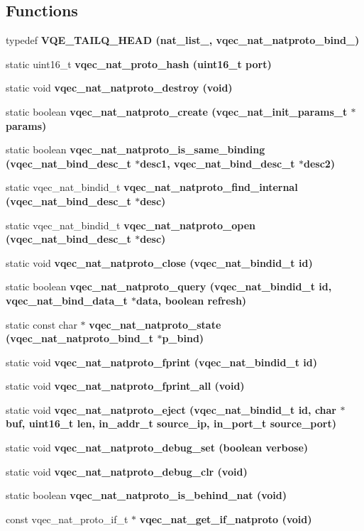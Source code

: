\subsection*{Functions}
\begin{CompactItemize}
\item 
typedef \bf{VQE\_\-TAILQ\_\-HEAD} (nat\_\-list\_\-, \bf{vqec\_\-nat\_\-natproto\_\-bind\_\-})
\item 
static uint16\_\-t \bf{vqec\_\-nat\_\-proto\_\-hash} (uint16\_\-t port)
\item 
static void \bf{vqec\_\-nat\_\-natproto\_\-destroy} (void)
\item 
static boolean \bf{vqec\_\-nat\_\-natproto\_\-create} (vqec\_\-nat\_\-init\_\-params\_\-t $\ast$params)
\item 
static boolean \bf{vqec\_\-nat\_\-natproto\_\-is\_\-same\_\-binding} (vqec\_\-nat\_\-bind\_\-desc\_\-t $\ast$desc1, vqec\_\-nat\_\-bind\_\-desc\_\-t $\ast$desc2)
\item 
static vqec\_\-nat\_\-bindid\_\-t \bf{vqec\_\-nat\_\-natproto\_\-find\_\-internal} (vqec\_\-nat\_\-bind\_\-desc\_\-t $\ast$desc)
\item 
static vqec\_\-nat\_\-bindid\_\-t \bf{vqec\_\-nat\_\-natproto\_\-open} (vqec\_\-nat\_\-bind\_\-desc\_\-t $\ast$desc)
\item 
static void \bf{vqec\_\-nat\_\-natproto\_\-close} (vqec\_\-nat\_\-bindid\_\-t id)
\item 
static boolean \bf{vqec\_\-nat\_\-natproto\_\-query} (vqec\_\-nat\_\-bindid\_\-t id, vqec\_\-nat\_\-bind\_\-data\_\-t $\ast$data, boolean refresh)
\item 
static const char $\ast$ \bf{vqec\_\-nat\_\-natproto\_\-state} (\bf{vqec\_\-nat\_\-natproto\_\-bind\_\-t} $\ast$p\_\-bind)
\item 
static void \bf{vqec\_\-nat\_\-natproto\_\-fprint} (vqec\_\-nat\_\-bindid\_\-t id)
\item 
static void \bf{vqec\_\-nat\_\-natproto\_\-fprint\_\-all} (void)
\item 
static void \bf{vqec\_\-nat\_\-natproto\_\-eject} (vqec\_\-nat\_\-bindid\_\-t id, char $\ast$buf, uint16\_\-t len, in\_\-addr\_\-t source\_\-ip, in\_\-port\_\-t source\_\-port)
\item 
static void \bf{vqec\_\-nat\_\-natproto\_\-debug\_\-set} (boolean verbose)
\item 
static void \bf{vqec\_\-nat\_\-natproto\_\-debug\_\-clr} (void)
\item 
static boolean \bf{vqec\_\-nat\_\-natproto\_\-is\_\-behind\_\-nat} (void)
\item 
const vqec\_\-nat\_\-proto\_\-if\_\-t $\ast$ \bf{vqec\_\-nat\_\-get\_\-if\_\-natproto} (void)
\end{CompactItemize}
